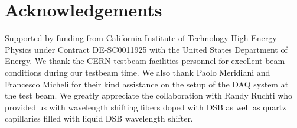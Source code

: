 \documentclass[preprint,1p]{elsarticle}
\begin{document}
  
%
%
  
%
%
  
%
%

\section{Acknowledgements} Supported by funding from California Institute of
Technology High Energy Physics under Contract DE-SC0011925 with the United
States Department of Energy. We thank the CERN testbeam facilities personnel for
excellent beam conditions during our testbeam time. We also thank Paolo
Meridiani and Francesco Micheli for their kind assistance on the setup of the
DAQ system at the test beam. We greatly appreciate the collaboration with Randy
Ruchti who provided us with wavelength shifting fibers doped with DSB as well as
quartz capillaries filled with liquid DSB wavelength shifter.
%
%


{}
 















\end{document}
